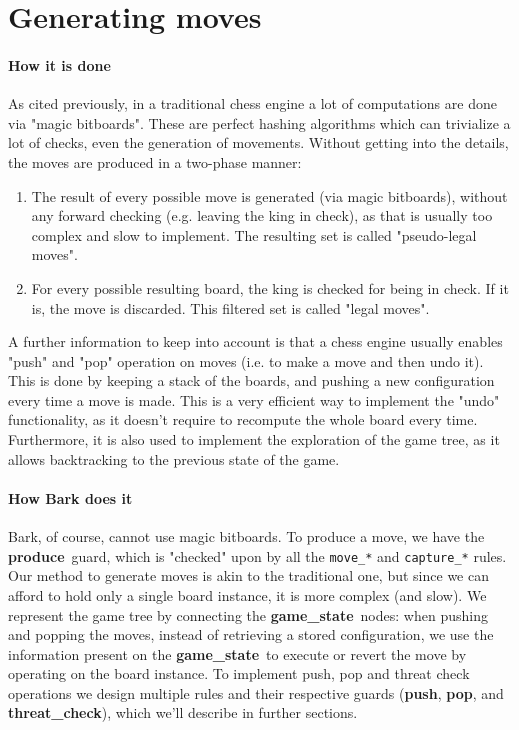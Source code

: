 \documentclass[a4paper, 10pt]{scrartcl}
\newcommand{\noderepr}[1]{\textsf{\textbf{#1}}}
\newcommand{\gamestate}{\noderepr{game\_state}}
\newcommand{\push}{\noderepr{push}}
\newcommand{\pop}{\noderepr{pop}}
\newcommand{\threatcheck}{\noderepr{threat\_check}}
\newcommand{\produce}{\noderepr{produce}}
\begin{document}
    \section{Generating moves}
    \paragraph*{How it is done} As cited previously, in a traditional chess engine a lot of computations are done via "magic bitboards". These are perfect hashing algorithms which can trivialize a lot of checks, even the generation of movements. Without getting into the details, the moves are produced in a two-phase manner:
    \begin{enumerate}
        \item The result of every possible move is generated (via magic bitboards), without any forward checking (e.g. leaving the king in check), as that is usually too complex and slow to implement. The resulting set is called "pseudo-legal moves".
        \item For every possible resulting board, the king is checked for being in check. If it is, the move is discarded. This filtered set is called "legal moves".
    \end{enumerate}
    A further information to keep into account is that a chess engine usually enables "push" and "pop" operation on moves (i.e. to make a move and then undo it). This is done by keeping a stack of the boards, and pushing a new configuration every time a move is made. This is a very efficient way to implement the "undo" functionality, as it doesn't require to recompute the whole board every time. Furthermore, it is also used to implement the exploration of the game tree, as it allows backtracking to the previous state of the game.
    \paragraph*{How Bark does it} Bark, of course, cannot use magic bitboards. To produce a move, we have the \produce\ guard, which is "checked" upon by all the \texttt{move\_*} and \texttt{capture\_*} rules.
    Our method to generate moves is akin to the traditional one, but since we can afford to hold only a single board instance, it is more complex (and slow). We represent the game tree by connecting the \gamestate\ nodes: when pushing and popping the moves, instead of retrieving a stored configuration, we use the information present on the \gamestate\ to execute or revert the move by operating on the board instance.
    To implement push, pop and threat check operations we design multiple rules and their respective guards (\push, \pop, and \threatcheck), which we'll describe in further sections.
\end{document}
